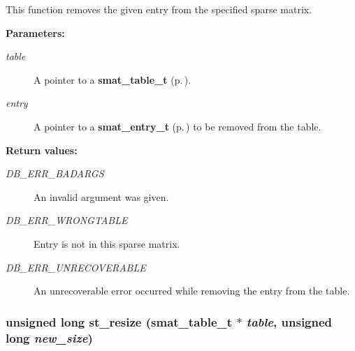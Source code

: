  This function removes the given entry from the specified sparse matrix.\begin{Desc}
\item[{\bf Parameters: }]\par
\begin{description}
\item[
{\em table}]A pointer to a {\bf smat\_\-table\_\-t} {\rm (p.\,\pageref{group__dbprim__smat_a0})}. \item[
{\em entry}]A pointer to a {\bf smat\_\-entry\_\-t} {\rm (p.\,\pageref{group__dbprim__smat_a2})} to be removed from the table.\end{description}
\end{Desc}
\begin{Desc}
\item[{\bf Return values: }]\par
\begin{description}
\item[
{\em DB\_\-ERR\_\-BADARGS}]An invalid argument was given. \item[
{\em DB\_\-ERR\_\-WRONGTABLE}]Entry is not in this sparse matrix. \item[
{\em DB\_\-ERR\_\-UNRECOVERABLE}]An unrecoverable error occurred while removing the entry from the table. \end{description}
\end{Desc}
\subsubsection{\setlength{\rightskip}{0pt plus 5cm}unsigned long st\_\-resize ({\bf smat\_\-table\_\-t} $\ast$ {\em table}, unsigned long {\em new\_\-size})}\label{group__dbprim__smat_a15}




